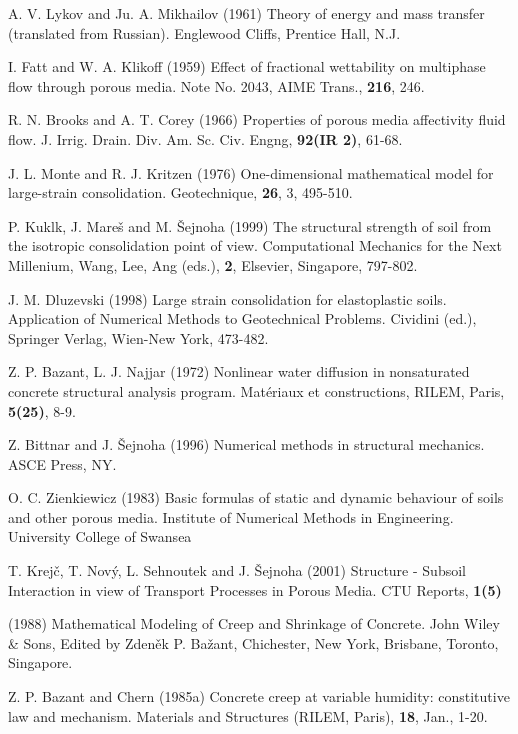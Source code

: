 \begin{thebibliography}{99}
A. V. Lykov and Ju. A. Mikhailov (1961) Theory of energy and mass transfer (translated from Russian).
Englewood Cliffs, Prentice Hall, N.J.

I. Fatt and W. A. Klikoff (1959) Effect of fractional wettability on multiphase flow through porous media. 
Note No. 2043, AIME Trans., {\bf 216}, 246.

R. N. Brooks and A. T. Corey (1966) Properties of porous media affectivity fluid flow.
J. Irrig. Drain. Div. Am. Sc. Civ. Engng, {\bf 92(IR 2)}, 61-68.

J. L. Monte and R. J. Kritzen (1976) One-dimensional mathematical model for large-strain consolidation.
Geotechnique, {\bf 26}, 3, 495-510.

P. Kukl\ii k, J. Mare\v{s} and M. \v{S}ejnoha (1999)
The structural strength of soil from the isotropic consolidation point of view.
Computational Mechanics for the Next Millenium, Wang, Lee, Ang (eds.), {\bf 2}, Elsevier, Singapore, 797-802.

J. M. Dluzevski (1998)
Large strain consolidation for elastoplastic soils. Application of Numerical Methods to Geotechnical Problems.
Cividini (ed.), Springer Verlag, Wien-New York, 473-482.

Z. P. Bazant, L. J. Najjar (1972) Nonlinear water diffusion in nonsaturated concrete
structural analysis program. Mat\'eriaux et constructions, RILEM, Paris, 
{\bf 5(25)}, 8-9.

Z. Bittnar and J. \v Sejnoha (1996) Numerical methods in structural
mechanics. ASCE Press, NY.

O. C. Zienkiewicz (1983) Basic formulas of static and dynamic behaviour of soils and other porous media.
Institute of Numerical Methods in Engineering. University College of Swansea

T. Krej\v{c}\ii , T. Nov\'y, L. Sehnoutek and J. \v{S}ejnoha (2001) Structure - Subsoil Interaction in view of Transport 
Processes in Porous Media. CTU Reports, {\bf 1(5)}

(1988) Mathematical Modeling of Creep and Shrinkage of Concrete. 
John Wiley \& Sons, Edited by Zden\v{e}k P. Ba\v{z}ant, Chichester, New York, Brisbane, Toronto, Singapore.

Z. P. Bazant and Chern (1985a) Concrete creep at variable humidity: constitutive law and mechanism. Materials and 
Structures (RILEM, Paris), {\bf 18}, Jan., 1-20.


\end{thebibliography}

